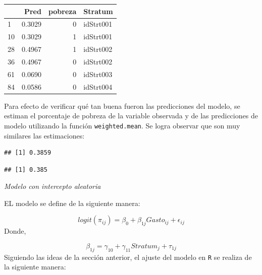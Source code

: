 \documentclass[
  spanish,
  12pt,
]{book}
\newenvironment{Shaded}{\begin{snugshade}}{\end{snugshade}}
\newcommand{\FunctionTok}[1]{\textcolor[rgb]{0.13,0.29,0.53}{\textbf{#1}}}
\newcommand{\NormalTok}[1]{#1}
\newcommand{\SpecialCharTok}[1]{\textcolor[rgb]{0.81,0.36,0.00}{\textbf{#1}}}
\begin{document}
\begin{tabular}{l|r|r|l}
\hline
  & Pred & pobreza & Stratum\\
\hline
1 & 0.3029 & 0 & idStrt001\\
\hline
10 & 0.3029 & 1 & idStrt001\\
\hline
28 & 0.4967 & 1 & idStrt002\\
\hline
36 & 0.4967 & 0 & idStrt002\\
\hline
61 & 0.0690 & 0 & idStrt003\\
\hline
84 & 0.0586 & 0 & idStrt004\\
\hline
\end{tabular}

Para efecto de verificar qué tan buena fueron las predicciones del modelo, se estiman el porcentaje de pobreza de la variable observada y de las predicciones de modelo utilizando la función \texttt{weighted.mean}. Se logra observar que son muy similares las estimaciones:

\begin{Shaded}
\end{Shaded}

\begin{verbatim}
## [1] 0.3859
\end{verbatim}

\begin{Shaded}
\end{Shaded}

\begin{verbatim}
## [1] 0.385
\end{verbatim}

\emph{Modelo con intercepto aleatoria}

EL modelo se define de la siguiente manera:

\[
logit(\pi_{ij})=\beta_{0}+\beta_{1j}Gasto_{ij}+\epsilon_{ij}
\]
Donde,

\[
\beta_{1j} = \gamma_{10}+\gamma_{11}Stratum_{j} + \tau_{1j}
\]
Siguiendo las ideas de la sección anterior, el ajuste del modelo en \texttt{R} se realiza de la siguiente manera:
\end{document}
